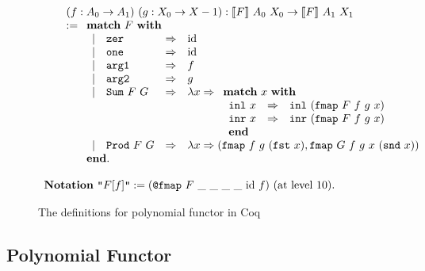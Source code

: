 \documentclass[runningheads, orivec]{llncs}
\begin{document}
\begin{figure}[tbhp]
\[\begin{array}{l}
\qquad (f : A_0 \to A_1)~ (g : X_0 \to X-1) : \llbracket F \rrbracket ~ A_0 ~ X_0 \to \llbracket F \rrbracket ~ A_1 ~ X_1\\
\qquad := 
\begin{array}[t]{l}
\mathbf{match}~F~\mathbf{with} \\
\begin{array}[t]{llll}
\mid & \verb~zer~ &\Rightarrow& \mathrm{id} \\
\mid & \verb~one~ &\Rightarrow& \mathrm{id} \\
\mid & \verb~arg1~ &\Rightarrow& f \\
\mid & \verb~arg2~ &\Rightarrow& g \\
\mid & \verb~Sum~~F~G &\Rightarrow& \lambda x \Rightarrow 
\begin{array}[t]{l}
\mathbf{match}~x~\mathbf{with}\\
\begin{array}{lll}
\verb~inl~~x &\Rightarrow& \verb~inl~~(\verb~fmap~~F~f~g~x) \\
\verb~inr~~x &\Rightarrow& \verb~inr~~(\verb~fmap~~F~f~g~x) \\
\mathbf{end}
\end{array}
\end{array}\\
\mid & \verb~Prod~~F~G &\Rightarrow& \lambda x \Rightarrow (\verb~fmap~~f~g~(\verb~fst~~x), \verb~fmap~~G~f~g~x~(\verb~snd~~x)) 
\end{array}\\
\mathbf{end}.
\end{array}\\
\\
\mathbf{Notation}~\verb~"~ F [ f ] \verb~"~ := (\verb~@fmap~~F~\_~\_~\_~\_~\mathrm{id}~f)~ (\text{at level 10}).
\end{array}
\]

\caption{The definitions for polynomial functor in Coq}
\label{fig:def_of_initial_alg}
\end{figure}

\subsection{Polynomial Functor}
\end{document}
